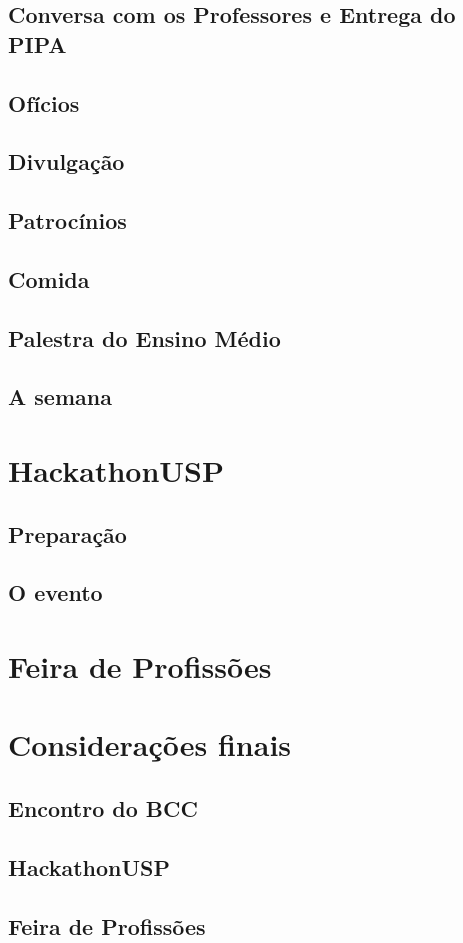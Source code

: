 \documentclass[12pt,letterpaper]{article}
\begin{document}
	\subsection{Conversa com os Professores e Entrega do PIPA}
	
	\subsection{Ofícios}
	
	\subsection{Divulgação}
	
	\subsection{Patrocínios}
	
	\subsection{Comida}
	
	\subsection{Palestra do Ensino Médio}
	
	\subsection{A semana}
	
	\section{HackathonUSP}
	
	\subsection{Preparação}
	
	\subsection{O evento}
	
	\section{Feira de Profissões}
	
	\section{Considerações finais}
	
	\subsection{Encontro do BCC}
	
	\subsection{HackathonUSP}
	
	\subsection{Feira de Profissões}
			 
\end{document}
